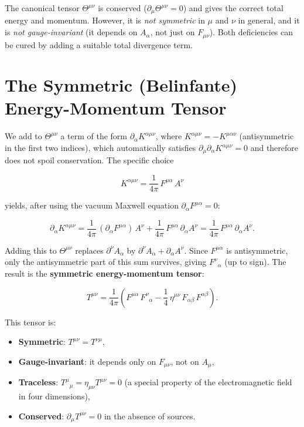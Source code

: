 The canonical tensor $\Theta^{\mu\nu}$ is conserved ($\partial_\mu\Theta^{\mu\nu} = 0$) and gives the correct total energy and momentum. However, it is \emph{not symmetric} in $\mu$ and $\nu$ in general, and it is \emph{not gauge-invariant} (it depends on $A_\alpha$, not just on $F_{\mu\nu}$). Both deficiencies can be cured by adding a suitable total divergence term.

\section{The Symmetric (Belinfante) Energy-Momentum Tensor}

We add to $\Theta^{\mu\nu}$ a term of the form $\partial_\alpha K^{\alpha\mu\nu}$, where $K^{\alpha\mu\nu} = -K^{\mu\alpha\nu}$ (antisymmetric in the first two indices), which automatically satisfies $\partial_\mu\partial_\alpha K^{\alpha\mu\nu} = 0$ and therefore does not spoil conservation. The specific choice

\begin{equation}
K^{\alpha\mu\nu} = \frac{1}{4\pi}\,F^{\mu\alpha}\,A^\nu
\end{equation}

yields, after using the vacuum Maxwell equation $\partial_\alpha F^{\mu\alpha} = 0$:

\begin{equation}
\partial_\alpha K^{\alpha\mu\nu} = \frac{1}{4\pi}\,(\partial_\alpha F^{\mu\alpha})\,A^\nu + \frac{1}{4\pi}\,F^{\mu\alpha}\,\partial_\alpha A^\nu = \frac{1}{4\pi}\,F^{\mu\alpha}\,\partial_\alpha A^\nu.
\end{equation}

Adding this to $\Theta^{\mu\nu}$ replaces $\partial^\nu A_\alpha$ by $\partial^\nu A_\alpha + \partial_\alpha A^\nu$. Since $F^{\mu\alpha}$ is antisymmetric, only the antisymmetric part of this sum survives, giving $F^{\nu}{}_\alpha$ (up to sign). The result is the \textbf{symmetric energy-momentum tensor}:

\begin{equation}
\boxed{T^{\mu\nu} = \frac{1}{4\pi}\!\left(F^{\mu\alpha}\,F^{\nu}{}_{\alpha} - \frac{1}{4}\,\eta^{\mu\nu}\,F_{\alpha\beta}\,F^{\alpha\beta}\right).}
\end{equation}

This tensor is:
\begin{itemize}
\item \textbf{Symmetric}: $T^{\mu\nu} = T^{\nu\mu}$,
\item \textbf{Gauge-invariant}: it depends only on $F_{\mu\nu}$, not on $A_\mu$,
\item \textbf{Traceless}: $T^\mu{}_\mu = \eta_{\mu\nu}T^{\mu\nu} = 0$ (a special property of the electromagnetic field in four dimensions),
\item \textbf{Conserved}: $\partial_\mu T^{\mu\nu} = 0$ in the absence of sources.
\end{itemize}

